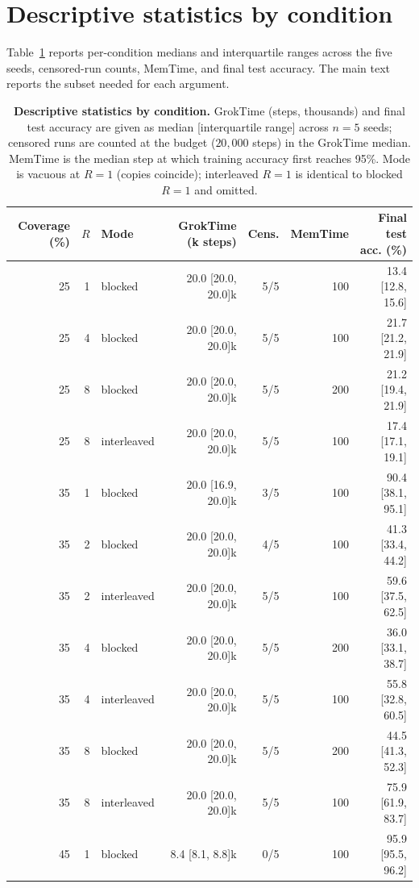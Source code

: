 \documentclass[10pt]{article}
\newcommand{\groktime}{GrokTime}
\newcommand{\memtime}{MemTime}
\begin{document}
\section{Descriptive statistics by condition}
\label{app:descriptives}

Table~\ref{tab:descriptives} reports per-condition medians and interquartile ranges across the five seeds, censored-run counts, \memtime{}, and final test accuracy. The main text reports the subset needed for each argument.

\begin{table}[h]
\centering
\caption{\textbf{Descriptive statistics by condition.} \groktime{} (steps, thousands) and final test accuracy are given as median [interquartile range] across $n=5$ seeds; censored runs are counted at the budget ($20{,}000$ steps) in the \groktime{} median. \memtime{} is the median step at which training accuracy first reaches 95\%. Mode is vacuous at $R=1$ (copies coincide); interleaved $R=1$ is identical to blocked $R=1$ and omitted.}
\label{tab:descriptives}
\small
\begin{tabular}{rrlrrrr}
\toprule
Coverage (\%) & $R$ & Mode & GrokTime (k steps) & Cens. & MemTime & Final test acc. (\%) \\
\midrule
25 & 1 & blocked & 20.0 [20.0, 20.0]k & 5/5 & 100 & 13.4 [12.8, 15.6] \\
25 & 4 & blocked & 20.0 [20.0, 20.0]k & 5/5 & 100 & 21.7 [21.2, 21.9] \\
25 & 8 & blocked & 20.0 [20.0, 20.0]k & 5/5 & 200 & 21.2 [19.4, 21.9] \\
25 & 8 & interleaved & 20.0 [20.0, 20.0]k & 5/5 & 100 & 17.4 [17.1, 19.1] \\
35 & 1 & blocked & 20.0 [16.9, 20.0]k & 3/5 & 100 & 90.4 [38.1, 95.1] \\
35 & 2 & blocked & 20.0 [20.0, 20.0]k & 4/5 & 100 & 41.3 [33.4, 44.2] \\
35 & 2 & interleaved & 20.0 [20.0, 20.0]k & 5/5 & 100 & 59.6 [37.5, 62.5] \\
35 & 4 & blocked & 20.0 [20.0, 20.0]k & 5/5 & 200 & 36.0 [33.1, 38.7] \\
35 & 4 & interleaved & 20.0 [20.0, 20.0]k & 5/5 & 100 & 55.8 [32.8, 60.5] \\
35 & 8 & blocked & 20.0 [20.0, 20.0]k & 5/5 & 200 & 44.5 [41.3, 52.3] \\
35 & 8 & interleaved & 20.0 [20.0, 20.0]k & 5/5 & 100 & 75.9 [61.9, 83.7] \\
45 & 1 & blocked & 8.4 [8.1, 8.8]k & 0/5 & 100 & 95.9 [95.5, 96.2] \\

\end{tabular}
\end{table}
\end{document}
